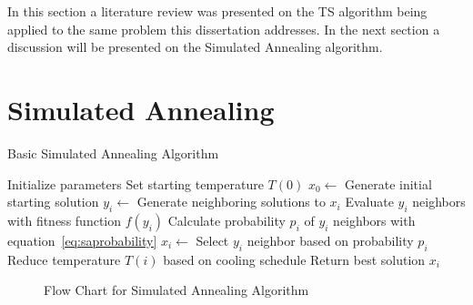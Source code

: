 In this section a literature review was presented on the TS algorithm being applied to the same problem this dissertation addresses. In the next section a discussion will be presented on the Simulated Annealing algorithm.
\section{Simulated Annealing}
\begin{algorithm}
\caption{Basic Simulated Annealing Algorithm}
\label{alg:SA}
	\begin{algorithmic}[1]
		\STATE Initialize parameters
		\STATE Set starting temperature $T(0)$
		\STATE $x_0 \leftarrow$ Generate initial starting solution
			\STATE $y_i \leftarrow$ Generate neighboring solutions to $x_i$
			\STATE Evaluate $y_i$ neighbors with fitness function $f(y_i)$
			\STATE Calculate probability $p_i$ of $y_i$ neighbors with equation~\ref{eq:saprobability}
			\STATE $x_i \leftarrow$ Select $y_i$ neighbor based on probability $p_i$
			\STATE Reduce temperature $T(i)$ based on cooling schedule
		\ENDWHILE
		\STATE Return best solution $x_i$
	\end{algorithmic}
\end{algorithm}
\begin{figure}[htbp!]
	\begin{center}
	\caption{Flow Chart for Simulated Annealing Algorithm}
	\label{fig:SimulatedAnnealingFlowChart}
	\end{center}
\end{figure}
